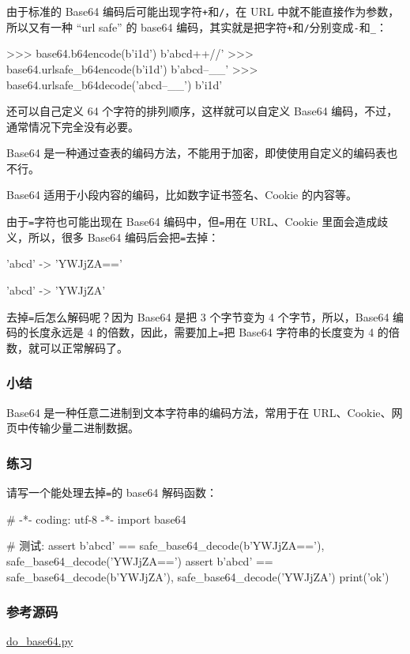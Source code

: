 由于标准的 Base64 编码后可能出现字符\texttt{+}和\texttt{/}，在 URL
中就不能直接作为参数，所以又有一种 ``url safe'' 的 base64
编码，其实就是把字符\texttt{+}和\texttt{/}分别变成\texttt{-}和\texttt{\_}：

\begin{pythoncode}
>>> base64.b64encode(b'i\x1d\xfb\xef\xff')
b'abcd++//'
>>> base64.urlsafe_b64encode(b'i\x1d\xfb\xef\xff')
b'abcd--__'
>>> base64.urlsafe_b64decode('abcd--__')
b'i\x1d\xfb\xef\xff'
\end{pythoncode}

还可以自己定义 64 个字符的排列顺序，这样就可以自定义 Base64
编码，不过，通常情况下完全没有必要。

Base64
是一种通过查表的编码方法，不能用于加密，即使使用自定义的编码表也不行。

Base64 适用于小段内容的编码，比如数字证书签名、Cookie 的内容等。

由于\texttt{=}字符也可能出现在 Base64 编码中，但\texttt{=}用在
URL、Cookie 里面会造成歧义，所以，很多 Base64 编码后会把\texttt{=}去掉：

\begin{pythoncode}
'abcd' -> 'YWJjZA=='

'abcd' -> 'YWJjZA'
\end{pythoncode}

去掉\texttt{=}后怎么解码呢？因为 Base64 是把 3 个字节变为 4
个字节，所以，Base64 编码的长度永远是 4
的倍数，因此，需要加上\texttt{=}把 Base64 字符串的长度变为 4
的倍数，就可以正常解码了。

\hypertarget{ux5c0fux7ed3}{%
\subsubsection{小结}\label{ux5c0fux7ed3}}

Base64 是一种任意二进制到文本字符串的编码方法，常用于在
URL、Cookie、网页中传输少量二进制数据。

\hypertarget{ux7ec3ux4e60}{%
\subsubsection{练习}\label{ux7ec3ux4e60}}

请写一个能处理去掉\texttt{=}的 base64 解码函数：

\begin{pythoncode}
# -*- coding: utf-8 -*-
import base64
\end{pythoncode}

\begin{pythoncode}
# 测试:
assert b'abcd' == safe_base64_decode(b'YWJjZA=='), safe_base64_decode('YWJjZA==')
assert b'abcd' == safe_base64_decode(b'YWJjZA'), safe_base64_decode('YWJjZA')
print('ok')
\end{pythoncode}

\hypertarget{ux53c2ux8003ux6e90ux7801}{%
\subsubsection{参考源码}\label{ux53c2ux8003ux6e90ux7801}}

\href{https://github.com/michaelliao/learn-python3/blob/master/samples/commonlib/do_base64.py}{do\_base64.py}

